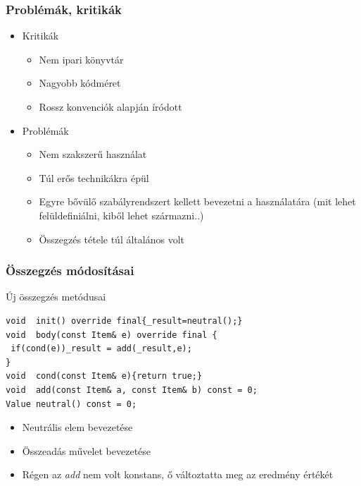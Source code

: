 \documentclass[11pt]{beamer}
\begin{document}
\begin{frame}
	\frametitle{Problémák, kritikák}
	\begin{itemize}
		\item Kritikák
		\begin{itemize}
			\item Nem ipari könyvtár
			\item Nagyobb kódméret
			\item Rossz konvenciók alapján íródott
		\end{itemize}
		\item Problémák
		\begin{itemize}
			\item Nem szakszerű használat
			\item Túl erős technikákra épül
			\item Egyre bővülő szabályrendszert kellett  bevezetni a használatára (mit lehet felüldefiniálni, kiből lehet származni..)
			\item Összegzés tétele túl általános volt
		\end{itemize}
	\end{itemize}
\end{frame}


\begin{frame}[fragile]
	\frametitle{Összegzés módosításai}
	\begin{block}{Új összegzés metódusai}
	\begin{lstlisting}[basicstyle=\small]
void  init() override final{_result=neutral();}
void  body(const Item& e) override final {
 if(cond(e))_result = add(_result,e);
}
void  cond(const Item& e){return true;}
void  add(const Item& a, const Item& b) const = 0;
Value neutral() const = 0;

	\end{lstlisting}
	\end{block}
	
	\begin{itemize}
	\item Neutrális elem bevezetése
	\item Összeadás művelet bevezetése
	\item Régen az \textit{add} nem volt konstans, ő változtatta meg az eredmény értékét
	\end{itemize}
\end{frame}
\end{document}
